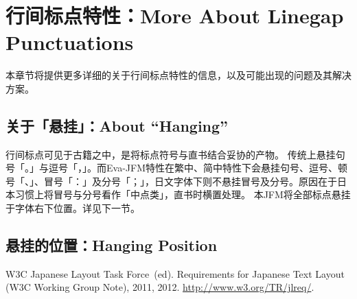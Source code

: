 \documentclass{ltjsarticle}
\begin{document}
\section{行间标点特性：More About Linegap Punctuations}\label{sec:lgp}
本章节将提供更多详细的关于行间标点特性的信息，以及可能出现的问题及其解决方案。

\subsection{关于「悬挂」：About ``Hanging''}
行间标点可见于古籍之中，是将标点符号与直书结合妥协的产物。
传统上悬挂句号「。\inhibitglue」与逗号「，\inhibitglue」。而\textsf{Eva-JFM}特性在繁中、简中特性下会悬挂句号、逗号、顿号「、\inhibitglue」、冒号「：\inhibitglue」及分号「；\inhibitglue」，日文字体下则不悬挂冒号及分号。原因在于日本习惯上将冒号与分号看作「中点类」，直书时横置处理。
本JFM将全部标点悬挂于字体右下位置。详见下一节。

\subsection{悬挂的位置：Hanging Position}

\begin{thebibliography}{99}
     W3C Japanese Layout Task Force~(ed). \newblock Requirements for Japanese Text Layout (W3C Working Group Note), 2011, 2012. \newblock \url{http://www.w3.org/TR/jlreq/}.
\end{thebibliography}
\end{document}
